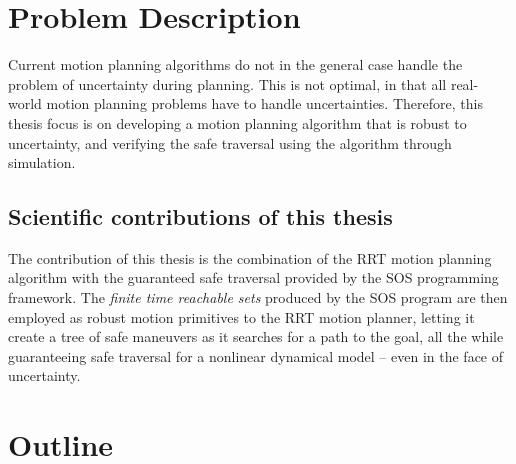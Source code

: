 \section{Problem Description}

Current motion planning algorithms do not in the general case handle the problem
of uncertainty during planning. This is not optimal, in that all real-world
motion planning problems have to handle uncertainties. Therefore, this thesis
focus is on developing a motion planning algorithm that is robust to
uncertainty, and verifying the safe traversal using the algorithm through
simulation.


\subsection{Scientific contributions of this thesis}

The contribution of this thesis is the combination of the \ac{RRT} motion
planning algorithm with the guaranteed safe traversal provided by the \ac{SOS}
programming framework. The \textit{finite time reachable sets} produced by the
\ac{SOS} program are then employed as robust motion primitives to the \ac{RRT}
motion planner, letting it create a tree of safe maneuvers as it searches for a
path to the goal, all the while guaranteeing safe traversal for a nonlinear
dynamical model -- even in the face of uncertainty.


\section{Outline}

